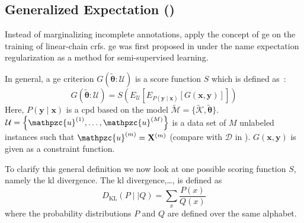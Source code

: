 \subsection{Generalized Expectation ()}

Instead of marginalizing incomplete annotations, \citet{mann2008generalized} apply the concept of \acrfull{ge} on the training of linear-chain \glspl{crf}.
\Gls{ge} was first proposed in \citet{mann2007simple} under the name \gls{expectation regularization} as a method for semi-supervised learning.


In general, a \gls{ge} criterion $G(\bm{\tilde{\theta}}:\mathcal{U})$ is a score function $S$ which is defined as~\citep{mann2010generalized}:
\begin{equation}
  \label{equ:generalized-expectation}
  G(\bm{\tilde{\theta}}:\mathcal{U})=S\left(E_{\mathcal{U}}\left[E_{P(\mathbf{y}\mid\mathbf{x})}\left[G(\mathbf{x},\mathbf{y})\right]\right]\right)
\end{equation}
Here, $P(\mathbf{y}\mid\mathbf{x})$ is a \gls{cpd} based on the model $\tilde{\mathcal{M}}=\{\tilde{\mathcal{K}},\bm{\tilde{\theta}}\}$.
$\mathcal{U}=\left\{\mathpzc{u}^{(1)},\dots,\mathpzc{u}^{(M)}\right\}$ is a data set of $M$ unlabeled instances such that $\mathpzc{u}^{(m)}=\mathbf{X}^{(m)}$ (compare with $\mathcal{D}$ in ).
$G(\mathbf{x},\mathbf{y})$ is given as a constraint function.


To clarify this general definition we now look at one possible scoring function $S$, namely the \acrshort{kl} divergence.
The \acrfull{kl} divergence,\dots, is defined as~\citep{mackay2003information}
\begin{equation}
  \label{equ:kl-divergence}
  D_{\text{KL}}(P\mid\mid Q)=\sum_x \frac{P(x)}{Q(x)}
\end{equation}
where the \glspl{probability distribution} $P$ and $Q$ are defined over the same alphabet.

